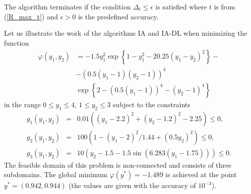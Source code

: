 \documentclass[twocolumn]{svjour3}          %
\begin{document}
The algorithm terminates if the condition $\Delta_{t} \leq \epsilon$ is satisfied where $t$ is from (\ref{R_max_t}) and $\epsilon>0$ is the predefined accuracy.

	Let us illustrate the work of the algorithms IA and IA-DL when minimizing the function
\begin{align*}
	\varphi(y_1, y_2) & = -1.5y_1^2\exp{\left\{1-y_1^2-20.25(y_1-y_2)^2\right\}}-\\
	& -\left(0.5(y_1-1)(y_2-1)\right)^4 \\
	& \exp{\left\{2-\left(0.5(y_1-1)\right)^4-(y_2-1)^4\right\}}
\end{align*}
in the range $0 \leq y_1 \leq 4$, $1 \leq y_2 \leq 3$ subject to the constraints
\begin{eqnarray*}
	g_1(y_1, y_2) & = & 0.01 \left( (y_1-2.2)^2+(y_2-1.2)^2-2.25 \right) \leq 0, \\
	g_2(y_1, y_2) & = & 100 \left(1-(y_1-2)^2/1.44+(0.5y_2)^2 \right) \leq 0, \\
	g_3(y_1, y_2) & = & 10 \left( y_2 - 1.5 - 1.5 \sin{\left( 6.283(y_1-1.75) \right)}\right) \leq 0.
\end{eqnarray*}
The feasible domain of this problem is non-connected and consists of three subdomains. The global minimum $\varphi(y^\ast)=-1.489$ is achieved at the point \\ $y^\ast =(0.942, 0.944)$ (the values are given with the accuracy of $10^{-3}$).
\end{document}

